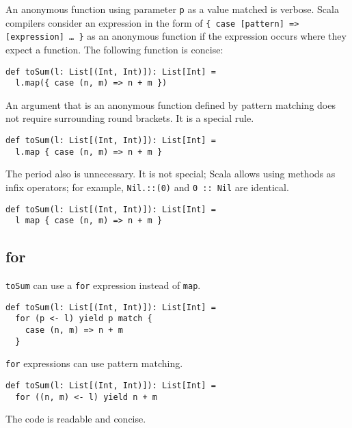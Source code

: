 An anonymous function using parameter \verb!p! as a value matched is verbose.
Scala compilers consider an expression in the form of \verb!{ case [pattern] => [expression] … }!
as an anonymous function if the expression occurs where they
expect a function. The following function is concise:

\begin{verbatim}
def toSum(l: List[(Int, Int)]): List[Int] =
  l.map({ case (n, m) => n + m })
\end{verbatim}

An argument that is an anonymous function defined by pattern matching does not
require surrounding round brackets. It is a special rule.

\begin{verbatim}
def toSum(l: List[(Int, Int)]): List[Int] =
  l.map { case (n, m) => n + m }
\end{verbatim}

The period also is unnecessary. It is not special; Scala allows using methods as
infix operators; for example, \verb!Nil.::(0)! and \verb!0 :: Nil! are identical.

\begin{verbatim}
def toSum(l: List[(Int, Int)]): List[Int] =
  l map { case (n, m) => n + m }
\end{verbatim}

\subsection{for}

\verb!toSum! can use a \verb!for! expression instead of \verb!map!.

\begin{verbatim}
def toSum(l: List[(Int, Int)]): List[Int] =
  for (p <- l) yield p match {
    case (n, m) => n + m
  }
\end{verbatim}

\verb!for! expressions can use pattern matching.

\begin{verbatim}
def toSum(l: List[(Int, Int)]): List[Int] =
  for ((n, m) <- l) yield n + m
\end{verbatim}

The code is readable and concise.
